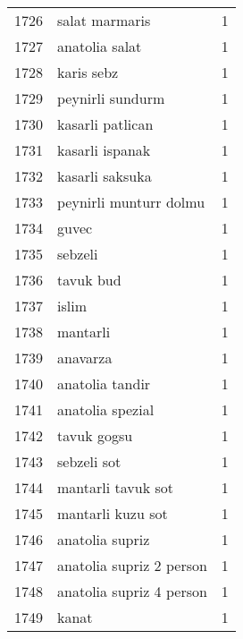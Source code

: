 \begin{tabular}{llr}
1726 &                                     salat marmaris &      1 \\
1727 &                                     anatolia salat &      1 \\
1728 &                                         karis sebz &      1 \\
1729 &                                   peynirli sundurm &      1 \\
1730 &                                   kasarli patlican &      1 \\
1731 &                                    kasarli ispanak &      1 \\
1732 &                                    kasarli saksuka &      1 \\
1733 &                             peynirli munturr dolmu &      1 \\
1734 &                                              guvec &      1 \\
1735 &                                            sebzeli &      1 \\
1736 &                                          tavuk bud &      1 \\
1737 &                                              islim &      1 \\
1738 &                                           mantarli &      1 \\
1739 &                                           anavarza &      1 \\
1740 &                                    anatolia tandir &      1 \\
1741 &                                   anatolia spezial &      1 \\
1742 &                                        tavuk gogsu &      1 \\
1743 &                                        sebzeli sot &      1 \\
1744 &                                 mantarli tavuk sot &      1 \\
1745 &                                  mantarli kuzu sot &      1 \\
1746 &                                    anatolia supriz &      1 \\
1747 &                           anatolia supriz 2 person &      1 \\
1748 &                           anatolia supriz 4 person &      1 \\
1749 &                                              kanat &      1 \\

\end{tabular}
